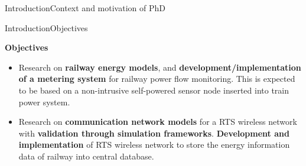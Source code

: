\begin{frame}{Introduction}{Context and motivation of PhD}
\begin{minipage}[t]{0.48\linewidth}
		
		
	\end{minipage}
	
\end{frame}





\begin{frame}{Introduction}{Objectives}
\begin{block}{\textbf{Objectives}}
\begin{itemize}
	\setlength\itemsep{0em}
	
	\item	Research on \textbf{railway energy models}, and \textbf{development/implementation of a metering system} for railway power flow monitoring.
	This is expected to be based on a non-intrusive self-powered sensor node inserted into train power system.
	
	\item Research on \textbf{communication network models} for a \ac{RTS} wireless network with \textbf{validation through simulation frameworks}.
	\textbf{Development and implementation} of \ac{RTS} wireless network to store the energy information data of railway into central database.
	
	
\end{itemize}
\end{block}
\end{frame}
